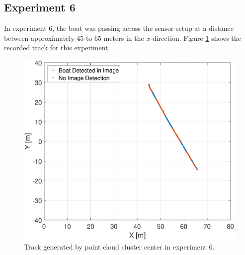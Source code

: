 \subsection{Experiment 6}
In experiment 6, the boat was passing across the sensor setup at a distance between approximately 45 to 65 meters in the $x$-direction. Figure \ref{fig:ex6_track} shows the recorded track for this experiment.  
\begin{figure}[!htb]
	\centering
	\includegraphics[width=.8\linewidth]{fig/exp_6_track.eps}
	\caption{Track generated by point cloud cluster center in experiment 6.}
	\label{fig:ex6_track}
\end{figure}

